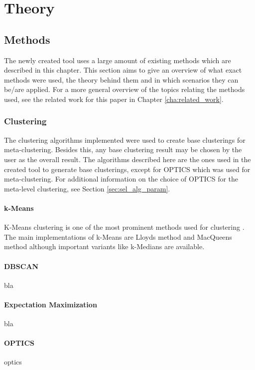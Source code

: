 \documentclass[
	a4paper,
	english,
	twoside,
	openright,               
	11pt                            
	]{report}
\begin{document}
\part{Theory}
\chapter{Methods}
The newly created tool uses a large amount of existing methods which are described in this chapter. This section aims to give an overview of what exact methods were used, the theory behind them and in which scenarios they can be/are applied. For a more general overview of the topics relating the methods used, see the related work for this paper in Chapter \ref{cha:related_work}.

\section{Clustering}
The clustering algorithms implemented were used to create base clusterings for meta-clustering. Besides this, any base clustering result may be chosen by the user as the overall result. The algorithms described here are the ones used in the created tool to generate base clusterings, except for OPTICS which was used for meta-clustering. For additional information on the choice of OPTICS for the meta-level clustering, see Section \ref{sec:sel_alg_param}.

\subsection{k-Means}
K-Means clustering is one of the most prominent methods used for clustering \cite{Jin2010}. The main implementations of k-Means are Lloyds method \cite{4031353} and MacQueens method \cite{macqueen1967} although important variants like k-Medians \cite{Dohan2015KmedianAT} are available.

\subsection{DBSCAN}
bla

\subsection{Expectation Maximization}
bla

\subsection{OPTICS}\label{sec:opticstheory}
optics \cite{10.1145/304181.304187}
\end{document}
